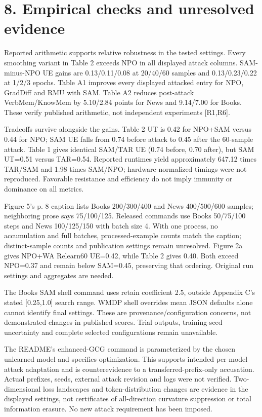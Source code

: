 \documentclass[10pt]{article}
\begin{document}
\section*{8. Empirical checks and unresolved evidence}
Reported arithmetic supports relative robustness in the tested settings. Every smoothing variant in Table 2 exceeds NPO in all displayed attack columns. SAM-minus-NPO UE gains are 0.13/0.11/0.08 at 20/40/60 samples and 0.13/0.23/0.22 at 1/2/3 epochs. Table A1 improves every displayed attacked entry for NPO, GradDiff and RMU with SAM. Table A2 reduces post-attack VerbMem/KnowMem by 5.10/2.84 points for News and 9.14/7.00 for Books. These verify published arithmetic, not independent experiments [R1,R6].\par
Tradeoffs survive alongside the gains. Table 2 UT is 0.42 for NPO+SAM versus 0.44 for NPO; SAM UE falls from 0.74 before attack to 0.45 after the 60-sample attack. Table 1 gives identical SAM/TAR UE (0.74 before, 0.70 after), but SAM UT=0.51 versus TAR=0.54. Reported runtimes yield approximately 647.12 times TAR/SAM and 1.98 times SAM/NPO; hardware-normalized timings were not reproduced. Favorable resistance and efficiency do not imply immunity or dominance on all metrics.\par
Figure 5’s p. 8 caption lists Books 200/300/400 and News 400/500/600 samples; neighboring prose says 75/100/125. Released commands use Books 50/75/100 steps and News 100/125/150 with batch size 4. With one process, no accumulation and full batches, processed-example counts match the caption; distinct-sample counts and publication settings remain unresolved. Figure 2a gives NPO+WA Relearn60 UE=0.42, while Table 2 gives 0.40. Both exceed NPO=0.37 and remain below SAM=0.45, preserving that ordering. Original run settings and aggregates are needed.\par
The Books SAM shell command uses retain coefficient 2.5, outside Appendix C’s stated [0.25,1.0] search range. WMDP shell overrides mean JSON defaults alone cannot identify final settings. These are provenance/configuration concerns, not demonstrated changes in published scores. Trial outputs, training-seed uncertainty and complete selected configurations remain unavailable.\par
The README’s enhanced-GCG command is parameterized by the chosen unlearned model and specifies optimization. This supports intended per-model attack adaptation and is counterevidence to a transferred-prefix-only accusation. Actual prefixes, seeds, external attack revision and logs were not verified. Two-dimensional loss landscapes and token-distribution changes are evidence in the displayed settings, not certificates of all-direction curvature suppression or total information erasure. No new attack requirement has been imposed.\par
\end{document}
